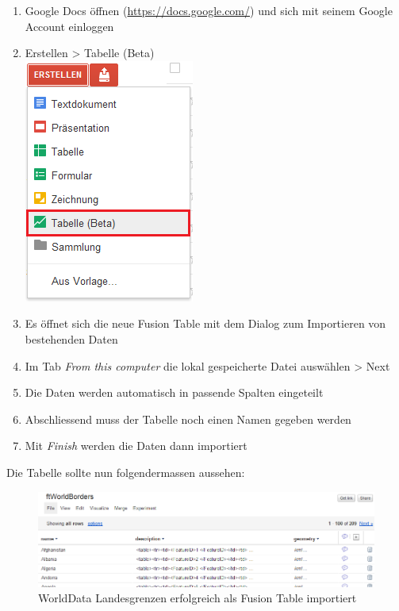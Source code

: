 \begin{enumerate}
\item Google Docs öffnen (\url{https://docs.google.com/}) und sich mit seinem Google Account einloggen
\item Erstellen > Tabelle (Beta) \\ \includegraphics{images/usecase1-worlddata/worlddata-worldborders_import1.png}
\item Es öffnet sich die neue Fusion Table mit dem Dialog zum Importieren von bestehenden Daten
\item Im Tab \emph{From this computer} die lokal gespeicherte Datei auswählen > Next
\item Die Daten werden automatisch in passende Spalten eingeteilt
\item Abschliessend muss der Tabelle noch einen Namen gegeben werden
\item Mit \emph{Finish} werden die Daten dann importiert
\end{enumerate}

Die Tabelle sollte nun folgendermassen aussehen:

\begin{figure}[htbp]
	\centering
	\includegraphics[scale=0.65]{images/usecase1-worlddata/worlddata-worldborders_import_done.png}
	\caption{WorldData Landesgrenzen erfolgreich als Fusion Table importiert}
	\label{worlddata-worldborders_import_done}
\end{figure}

